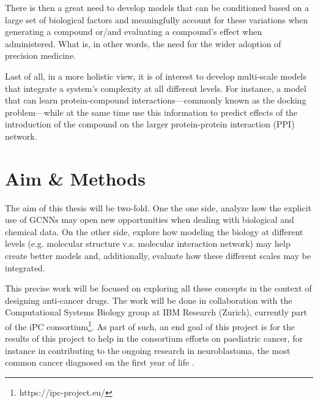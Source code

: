 \documentclass{article}
\begin{document}
There is then a great need to develop models that can be conditioned based on a large
set of biological factors and meaningfully account for these variations when generating
a compound or/and evaluating a compound's effect when administered. What is, in other
words, the need for the wider adoption of precision medicine.

Last of all, in a more holistic view, it is of interest to develop multi-scale models
that integrate a system's complexity at all different levels. For instance, a model that
can learn protein-compound interactions---commonly known as the docking problem---while
at the same time use this information to predict effects of the introduction of the
compound on the larger protein-protein interaction (PPI) network\cite{Sun2019}.

    \section*{Aim \& Methods}

The aim of this thesis will be two-fold. One the one side, analyze how the explicit
use of GCNNs may open new opportunities when dealing with biological and chemical
data. On the other side, explore how modeling the biology at different levels (e.g.
molecular structure v.s. molecular interaction network) may help create better
models and, additionally, evaluate how these different scales may be integrated.

This precise work will be focused on exploring all these concepts in the context of
designing anti-cancer drugs. The work will be done in collaboration with the
Computational Systems Biology group at IBM Research (Zurich), currently part of the iPC
consortium\footnote{https://ipc-project.eu/}. As part of such, an end goal of this
project is for the results of this project to help in the consortium efforts on
paediatric cancer, for instance in contributing to the ongoing research in
neuroblastoma, the most common cancer diagnosed on the first year of life
\cite{Maris2010}.
\end{document}
